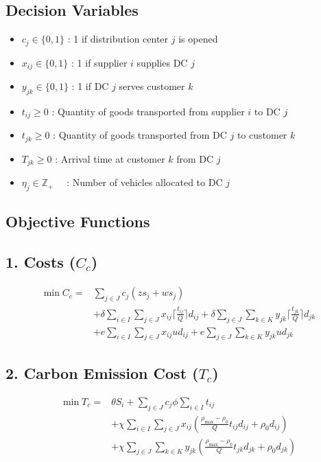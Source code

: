 \documentclass[conference]{IEEEtran}
\begin{document}
\subsection*{Decision Variables}
\begin{itemize}
    \item $c_j \in \{0,1\}$ : 1 if distribution center $j$ is opened
    \item $x_{ij} \in \{0,1\}$ : 1 if supplier $i$ supplies DC $j$
    \item $y_{jk} \in \{0,1\}$ : 1 if DC $j$ serves customer $k$
    \item $t_{ij} \geq 0$ : Quantity of goods transported from supplier $i$ to DC $j$
    \item $t_{jk} \geq 0$ : Quantity of goods transported from DC $j$ to customer $k$
    \item $T_{jk} \geq 0$ : Arrival time at customer $k$ from DC $j$
    \item $\eta_j \in \mathbb{Z}_+ \quad$ : Number of vehicles allocated to DC $j$
\end{itemize}

\subsection*{Objective Functions}
\subsection*{1. Costs ($C_c$)}
\begin{align}
\min C_c = &\sum_{j \in J} c_j (z s_j + w s_j) \\
&+ \delta \sum_{i \in I} \sum_{j \in J} x_{ij} \lceil \frac{t_{ij}}{Q}\rceil d_{ij}
+ \delta \sum_{j \in J} \sum_{k \in K} y_{jk} \lceil \frac{t_{jk}}{Q} \rceil d_{jk} \nonumber \\
&
+ e \sum_{i \in I} \sum_{j \in J} x_{ij} u d_{ij}
+ e \sum_{j \in J} \sum_{k \in K} y_{jk} u d_{jk} \nonumber
\end{align}

\subsection*{2. Carbon Emission Cost ($T_c$)}
\begin{align}
\min T_c = &\theta S_i+ \sum_{j \in J} c_j \phi \sum_{i \in I} t_{ij} \\
&+ \chi \sum_{i \in I} \sum_{j \in J} x_{ij} \left(
\frac{\rho_{\max} - \rho_0}{Q} t_{ij} d_{ij} + \rho_0 d_{ij}
\right) \nonumber \\
&+ \chi \sum_{j \in J} \sum_{k \in K} y_{jk} \left(
\frac{\rho_{\max} - \rho_0}{Q} t_{jk} d_{jk} + \rho_0 d_{jk}
\right) \nonumber
\end{align}
\end{document}
